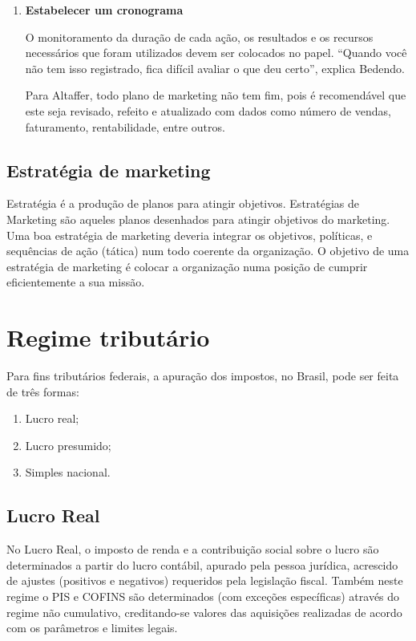 \documentclass[
	12pt,				%
	openright,			%
	oneside,			%
	a4paper,			%
	english,			%
	french,				%
	spanish,			%
	brazil				%
	]{abntex2}
\begin{document}
\begin{enumerate}
		\item \textbf{Estabelecer um cronograma}
		
		O monitoramento da duração de cada ação, os resultados e os recursos necessários que foram utilizados devem ser colocados no papel. “Quando você não tem isso registrado, fica difícil avaliar o que deu certo”, explica Bedendo.
		
	Para Altaffer, todo plano de marketing não tem fim, pois é recomendável que este seja revisado, refeito e atualizado com dados como número de vendas, faturamento, rentabilidade, entre outros.
		
	\end{enumerate}

\subsection[Estratégia de marketing]{Estratégia de marketing}

	Estratégia é a produção de planos para atingir objetivos. Estratégias de Marketing são aqueles planos desenhados para atingir objetivos do marketing. Uma boa estratégia de marketing deveria integrar os objetivos, políticas, e sequências de ação (tática) num todo coerente da organização. O objetivo de uma estratégia de marketing é colocar a organização numa posição de cumprir eficientemente a sua missão.
	
\section{Regime tributário}

	Para  fins tributários federais, a apuração dos impostos, no Brasil, pode ser feita de três formas:
	
	\begin{enumerate}
		\item Lucro real;
		\item Lucro presumido;
		\item Simples nacional.
	\end{enumerate}
	
\subsection{Lucro Real}

	No Lucro Real, o imposto de renda e a contribuição social sobre o lucro são determinados a partir do lucro contábil, apurado pela pessoa jurídica, acrescido de ajustes (positivos e negativos) requeridos pela legislação fiscal. Também neste regime o PIS e COFINS são determinados (com exceções específicas) através do regime não cumulativo, creditando-se valores das aquisições realizadas de acordo com os parâmetros e limites legais.
	
\end{document}
